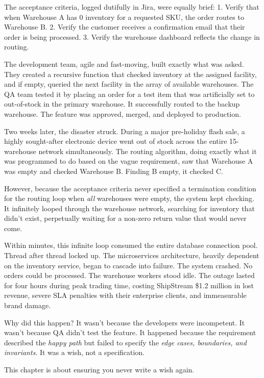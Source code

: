 The acceptance criteria, logged dutifully in Jira, were equally brief:
1. Verify that when Warehouse A has 0 inventory for a requested SKU, the
order routes to Warehouse B. 2. Verify the customer receives a
confirmation email that their order is being processed. 3. Verify the
warehouse dashboard reflects the change in routing.

The development team, agile and fast-moving, built exactly what was
asked. They created a recursive function that checked inventory at the
assigned facility, and if empty, queried the next facility in the array
of available warehouses. The QA team tested it by placing an order for a
test item that was artificially set to out-of-stock in the primary
warehouse. It successfully routed to the backup warehouse. The feature
was approved, merged, and deployed to production.

Two weeks later, the disaster struck. During a major pre-holiday flash
sale, a highly sought-after electronic device went out of stock across
the entire 15-warehouse network simultaneously. The routing algorithm,
doing exactly what it was programmed to do based on the vague
requirement, saw that Warehouse A was empty and checked Warehouse B.
Finding B empty, it checked C.

However, because the acceptance criteria never specified a termination
condition for the routing loop when \emph{all} warehouses were empty,
the system kept checking. It infinitely looped through the warehouse
network, searching for inventory that didn't exist, perpetually waiting
for a non-zero return value that would never come.

Within minutes, this infinite loop consumed the entire database
connection pool. Thread after thread locked up. The microservices
architecture, heavily dependent on the inventory service, began to
cascade into failure. The system crashed. No orders could be processed.
The warehouse workers stood idle. The outage lasted for four hours
during peak trading time, costing ShipStream \$1.2 million in lost
revenue, severe SLA penalties with their enterprise clients, and
immeasurable brand damage.

Why did this happen? It wasn't because the developers were incompetent.
It wasn't because QA didn't test the feature. It happened because the
requirement described the \emph{happy path} but failed to specify the
\emph{edge cases, boundaries, and invariants}. It was a wish, not a
specification.

This chapter is about ensuring you never write a wish again.

